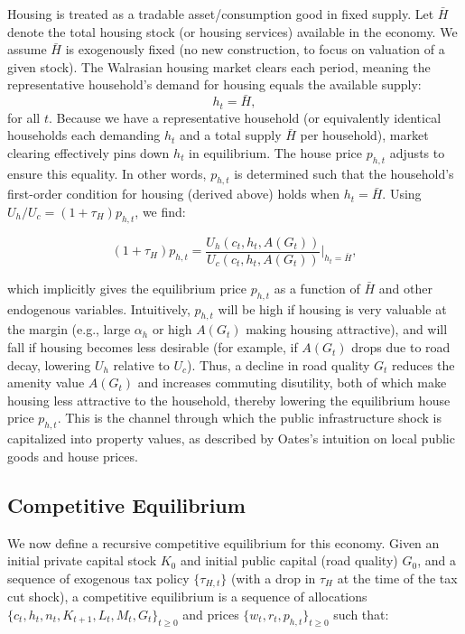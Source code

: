 Housing is treated as a tradable asset/consumption good in fixed supply. Let $\bar{H}$ denote the total housing stock (or housing services) available in the economy. We assume $\bar{H}$ is exogenously fixed (no new construction, to focus on valuation of a given stock). The Walrasian housing market clears each period, meaning the representative household’s demand for housing equals the available supply:
\begin{equation}
h_t = \bar{H},
\end{equation}
for all $t$. Because we have a representative household (or equivalently identical households each demanding $h_t$ and a total supply $\bar{H}$ per household), market clearing effectively pins down $h_t$ in equilibrium. The house price $p_{h,t}$ adjusts to ensure this equality. In other words, $p_{h,t}$ is determined such that the household’s first-order condition for housing (derived above) holds when $h_t=\bar{H}$. Using $U_h/U_c = (1+\tau_H)p_{h,t}$, we find:

\begin{equation}
    (1+\tau_H)p_{h,t} = \frac{U_h(c_t, h_t, A(G_t))}{U_c(c_t, h_t, A(G_t))}\Big|_{h_t=\bar{H}},
\end{equation}

which implicitly gives the equilibrium price $p_{h,t}$ as a function of $\bar{H}$ and other endogenous variables. Intuitively, $p_{h,t}$ will be high if housing is very valuable at the margin (e.g., large $\alpha_h$ or high $A(G_t)$ making housing attractive), and will fall if housing becomes less desirable (for example, if $A(G_t)$ drops due to road decay, lowering $U_h$ relative to $U_c$). Thus, a decline in road quality $G_t$ reduces the amenity value $A(G_t)$ and increases commuting disutility, both of which make housing less attractive to the household, thereby lowering the equilibrium house price $p_{h,t}$. This is the channel through which the public infrastructure shock is capitalized into property values, as described by Oates’s intuition on local public goods and house prices.

\subsection{Competitive Equilibrium}

We now define a recursive competitive equilibrium for this economy. Given an initial private capital stock $K_0$ and initial public capital (road quality) $G_0$, and a sequence of exogenous tax policy $\{\tau_{H,t}\}$ (with a drop in $\tau_H$ at the time of the tax cut shock), a competitive equilibrium is a sequence of allocations $\{c_t, h_t, n_t, K_{t+1}, L_t, M_t, G_t\}_{t\ge0}$ and prices $\{w_t, r_t, p_{h,t}\}_{t\ge0}$ such that:

